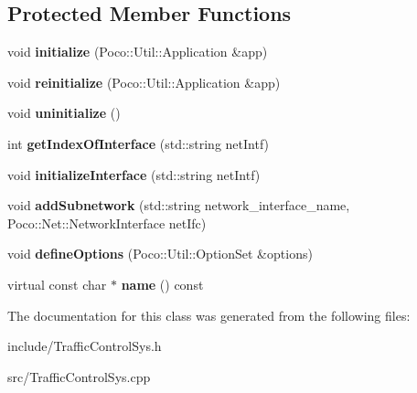 \subsection*{Protected Member Functions}
\begin{DoxyCompactItemize}
\item 
\mbox{\label{classecodtn_1_1net_1_1TrafficControlSys_a4422cdd38eeac9f31754d4d2af2d8f2e}} 
void {\bfseries initialize} (Poco\+::\+Util\+::\+Application \&app)
\item 
\mbox{\label{classecodtn_1_1net_1_1TrafficControlSys_a6d20a683b6b786c1fcecb0090163543f}} 
void {\bfseries reinitialize} (Poco\+::\+Util\+::\+Application \&app)
\item 
\mbox{\label{classecodtn_1_1net_1_1TrafficControlSys_a22674dbf6ff275698464564b2072f88d}} 
void {\bfseries uninitialize} ()
\item 
\mbox{\label{classecodtn_1_1net_1_1TrafficControlSys_a4e2b130c300f2bd959f28eec7ff0c889}} 
int {\bfseries get\+Index\+Of\+Interface} (std\+::string net\+Intf)
\item 
\mbox{\label{classecodtn_1_1net_1_1TrafficControlSys_abf506b0d68a7d5189c2fd9b5cba7df59}} 
void {\bfseries initialize\+Interface} (std\+::string net\+Intf)
\item 
\mbox{\label{classecodtn_1_1net_1_1TrafficControlSys_a116487a1e13a71f877d07415c41fc5ce}} 
void {\bfseries add\+Subnetwork} (std\+::string network\+\_\+interface\+\_\+name, Poco\+::\+Net\+::\+Network\+Interface net\+Ifc)
\item 
\mbox{\label{classecodtn_1_1net_1_1TrafficControlSys_a663ae1488f26f6671abb3c7da2483494}} 
void {\bfseries define\+Options} (Poco\+::\+Util\+::\+Option\+Set \&options)
\item 
\mbox{\label{classecodtn_1_1net_1_1TrafficControlSys_ad6d8105f3b1fb3ecdf5dd7bc8066378d}} 
virtual const char $\ast$ {\bfseries name} () const
\end{DoxyCompactItemize}


The documentation for this class was generated from the following files\+:\begin{DoxyCompactItemize}
\item 
include/Traffic\+Control\+Sys.\+h\item 
src/Traffic\+Control\+Sys.\+cpp\end{DoxyCompactItemize}

